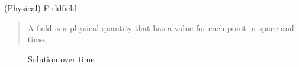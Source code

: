 \begin{myDefinition}{(Physical) Field}{field}
\blockquote[{\cite{gribbin1998q}}]{
A field is a physical quantity that has a value for each point in space and time.
}
\end{myDefinition}



\begin{figure}[!htb]
	\resizebox{0.84\textwidth}{!}{}
	\caption{Solution over time}
	\label{fig:sin}
\end{figure}

